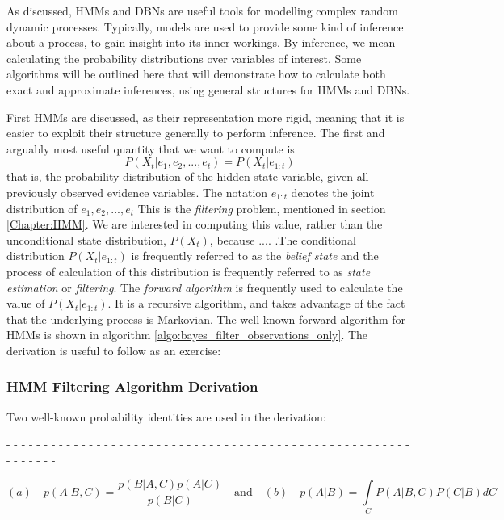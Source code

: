 As discussed, HMMs and DBNs are useful tools for modelling complex random dynamic processes. Typically, models are used to provide some kind of inference about a process, to gain insight into its inner workings. By inference, we mean calculating the probability distributions over variables of interest. Some algorithms will be outlined here that will demonstrate how to calculate both exact and approximate inferences, using general structures for HMMs and DBNs. \par

First HMMs are discussed, as their representation more rigid, meaning that it is easier to exploit their structure generally to perform inference. The first and arguably most useful quantity that we want to compute is 
\[P(X_t | e_1, e_2, ..., e_t) = P(X_t | e_{1:t})\]
that is, the probability distribution of the hidden state variable, given all previously observed evidence variables. The notation $e_{1:t}$ denotes the joint distribution of $e_1, e_2, ..., e_t$ This is the \textit{filtering} problem, mentioned in section \ref{Chapter:HMM}. We are interested in computing this value, rather than the unconditional state distribution, $P(X_t)$, because .... .The conditional distribution $P(X_t | e_{1:t})$ is frequently referred to as the \textit{belief state} and the process of calculation of this distribution is frequently referred to as \textit{state estimation} or \textit{filtering}. The \textit{forward algorithm} is frequently used to calculate the value of $P(X_t | e_{1:t})$. It is a recursive algorithm, and takes advantage of the fact that the underlying process is Markovian. The well-known forward algorithm for HMMs is shown in algorithm \ref{algo:bayes_filter_observations_only}. The derivation is useful to follow as an exercise:
\subsubsection{HMM Filtering Algorithm Derivation}
Two well-known probability identities are used in the derivation: 
\begin{center}
- - - - - - - - - - - - - - - - - - - - - - - - - - - - - - - - - - - - - - - - - - - - - - - - - - - - - - - - - - - - - 
\end{center}
\[(a) \quad p(A | B, C) = \frac{p(B | A, C) p(A | C)}{p(B | C)} \quad \text{and} \quad (b) \quad p(A | B) = \int\limits_{C}P(A | B, C) P(C | B)dC\]

